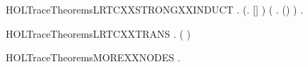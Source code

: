 \newcommand{\HOLTraceTheoremsLRTCXXSINGLE}{\UseVerbatim{HOLTraceTheoremsLRTCXXSINGLE}}
\begin{SaveVerbatim}{HOLTraceTheoremsLRTCXXSTRONGXXINDUCT}
\HOLTokenTurnstile{} \HOLSymConst{\HOLTokenForall{}} .
       (\HOLSymConst{\HOLTokenForall{}}.   [] ) \HOLSymConst{\HOLTokenConj{}}
       (\HOLSymConst{\HOLTokenForall{}}    .
                \HOLSymConst{\HOLTokenConj{}}      \HOLSymConst{\HOLTokenConj{}}     \HOLSymConst{\HOLTokenImp{}}   (\HOLSymConst{::}) ) \HOLSymConst{\HOLTokenImp{}}
       \HOLSymConst{\HOLTokenForall{}}  .      \HOLSymConst{\HOLTokenImp{}}    
\end{SaveVerbatim}
\newcommand{\HOLTraceTheoremsLRTCXXSTRONGXXINDUCT}{\UseVerbatim{HOLTraceTheoremsLRTCXXSTRONGXXINDUCT}}
\begin{SaveVerbatim}{HOLTraceTheoremsLRTCXXTRANS}
\HOLTokenTurnstile{} \HOLSymConst{\HOLTokenForall{}}     .
            \HOLSymConst{\HOLTokenConj{}}      \HOLSymConst{\HOLTokenImp{}}    ( \HOLSymConst{++} ) 
\end{SaveVerbatim}
\newcommand{\HOLTraceTheoremsLRTCXXTRANS}{\UseVerbatim{HOLTraceTheoremsLRTCXXTRANS}}
\begin{SaveVerbatim}{HOLTraceTheoremsMOREXXNODES}
\HOLTokenTurnstile{} \HOLSymConst{\HOLTokenForall{}}  .  \HOLConst{\HOLTokenIn{}}   \HOLSymConst{\HOLTokenConj{}}    \HOLSymConst{\HOLTokenImp{}}  \HOLConst{\HOLTokenIn{}}  
\end{SaveVerbatim}
